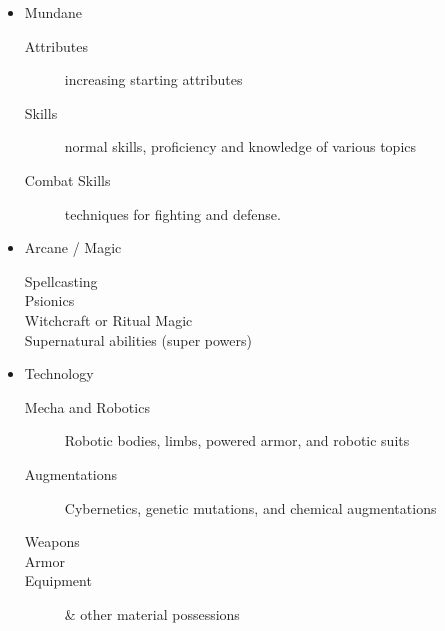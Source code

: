 \documentclass[twoside]{book}
\begin{document}
\begin{itemize}
      
  \item   
                 Mundane 
                  
\begin{description}
    
  \item[ Attributes ]   increasing starting attributes 
  \item[ Skills ]   normal skills, proficiency and knowledge
                         of various topics 
  \item[ Combat Skills ]   techniques for fighting and defense.
                         
\end{description}
    
                  
              
  \item   
                 Arcane / Magic 
                  
\begin{description}
    
  \item[ Spellcasting ] 
  \item[ Psionics ] 
  \item[ Witchcraft or Ritual Magic
                       ] 
  \item[ Supernatural abilities (super powers)
                       ] 
\end{description}
  
                  
              
  \item   
                 Technology 
                  
\begin{description}
    
  \item[ Mecha and Robotics ]  Robotic bodies, limbs, powered armor, and
                       robotic suits 
  \item[ Augmentations ]  Cybernetics, genetic mutations, and chemical
                       augmentations 
  \item[ Weapons ] 
  \item[ Armor ] 
  \item[ Equipment ]   \& other material possessions 
\end{description}
  
                  
              
\end{itemize}
  
\end{document}
